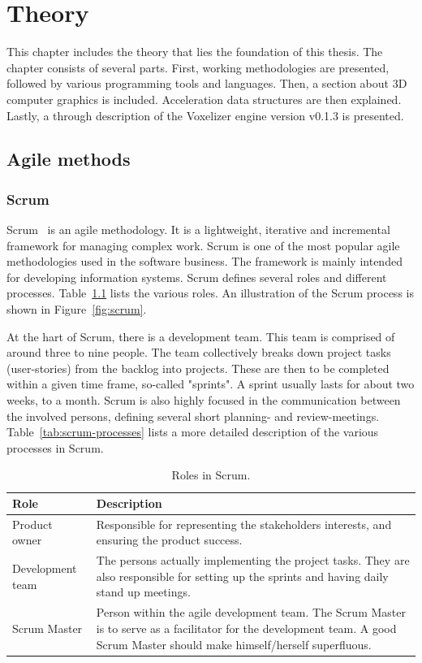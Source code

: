 \chapter{Theory}
This chapter includes the theory that lies the foundation of this thesis. The chapter consists of several parts. First, working methodologies are presented, followed by various programming tools and languages. Then, a section about 3D computer graphics is included. Acceleration data structures are then explained. Lastly, a through description of the Voxelizer engine version v0.1.3 is presented. 

\section{Agile methods}
\subsection{Scrum}
\label{sec:theory-scrum}
Scrum~\cite{scrum} is an agile methodology. It is a lightweight, iterative and incremental framework for managing complex work. Scrum is one of the most popular agile methodologies used in the software business. The framework is mainly intended for developing information systems. Scrum defines several roles and different processes. Table~\ref{tab:scrum-roles} lists the various roles. An illustration of the Scrum process is shown in Figure~\ref{fig:scrum}.

At the hart of Scrum, there is a development team. This team is comprised of around three to nine people. The team collectively breaks down project tasks (user-stories) from the backlog into projects. These are then to be completed within a given time frame, so-called "sprints". A sprint usually lasts for about two weeks, to a month. Scrum is also highly focused in the communication between the involved persons, defining several short planning- and review-meetings. Table~\ref{tab:scrum-processes} lists a more detailed description of the various processes in Scrum. 

\begin{table}[H]
    \centering
    \caption{Roles in Scrum.}
    \label{tab:scrum-roles}
    \begin{tabularx}{\textwidth}{|l|X|}
        \hline
        \textbf{Role} & \textbf{Description}\\
        \hline
        Product owner & Responsible for representing the stakeholders interests, and ensuring the product success.\\
        \hline
        Development team & The persons actually implementing the project tasks. They are also responsible for setting up the sprints and having daily stand up meetings.\\
        \hline
        Scrum Master & Person within the agile development team. The Scrum Master is to serve as a facilitator for the development team. A good Scrum Master should make himself/herself superfluous.\\
        \hline
    \end{tabularx}
\end{table}

